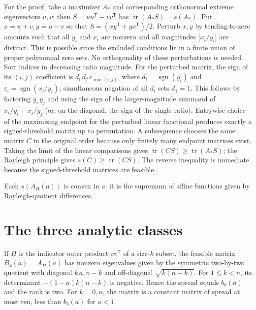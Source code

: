 \documentclass[11pt]{article}
\begin{document}
For the proof, take a maximizer \(A_*\) and corresponding orthonormal extreme eigenvectors \(u,v\); then \(S=uu^{\mathsf T}-vv^{\mathsf T}\) has \(\operatorname{tr}(A_* S)=s(A_*)\). Put \(x=u+v,y=u-v\) so that \(S=(xy^{\mathsf T}+yx^{\mathsf T})/2\). Perturb \(x,y\) by tending-to-zero amounts such that all \(y_i\) and \(x_i\) are nonzero and all magnitudes \(|x_i/y_i|\) are distinct. This is possible since the excluded conditions lie in a finite union of proper polynomial zero sets. No orthogonality of these perturbations is needed. Sort indices in decreasing ratio magnitude. For the perturbed matrix, the sign of its \((i,j)\) coefficient is \(d_i\,d_j\,\varepsilon_{\min(i,j)}\), where \(d_i=\operatorname{sgn}(y_i)\) and \(\varepsilon _i=\operatorname{sgn}(x_i/y_i)\); simultaneous negation of all \(d_i\) sets \(d_1=1\). This follows by factoring \(y_i\,y_j\) and using the sign of the larger-magnitude summand of \(x_i/y_i+x_j/y_j\) (or, on the diagonal, the sign of the single ratio). Entrywise choice of the maximizing endpoint for the perturbed linear functional produces exactly a signed-threshold matrix up to permutation. A subsequence chooses the same matrix \(C\) in the original order because only finitely many endpoint matrices exist. Taking the limit of the linear comparisons gives \(\operatorname{tr}(C S)\ge \operatorname{tr}(A_* S)\); the Rayleigh principle gives \(s(C)\ge \operatorname{tr}(C S)\). The reverse inequality is immediate because the signed-threshold matrices are feasible.

Each \(s(A_H(a))\) is convex in \(a\): it is the supremum of affine functions given by Rayleigh-quotient differences.

\section{The three analytic classes}\label{the-three-analytic-classes}

If \(H\) is the indicator outer product \(vv^{\mathsf T}\) of a size-\(k\) subset, the feasible matrix \(B_k(a)=A_H(a)\) has nonzero eigenvalues given by the symmetric two-by-two quotient with diagonal \(k\,a,n-k\) and off-diagonal \(\sqrt{k(n-k)}\). For \(1\le k<n\), its determinant \(-(1-a)k(n-k)\) is negative. Hence the spread equals \(b_k(a)\) and the rank is two. For \(k=0,n\), the matrix is a constant matrix of spread at most ten, less than \(b_3(a)\) for \(a<1\).
\end{document}
